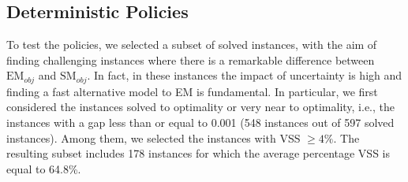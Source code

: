 \documentclass[authoryear,preprint,12pt]{elsarticle}
\begin{document}



\subsection{Deterministic Policies}\label{detpolicies}

To test the policies, we selected a subset of solved instances, with the aim of finding challenging instances where there is a remarkable difference between $\text{EM}_{obj}$ and $\text{SM}_{obj}$. In fact, in these instances the impact of uncertainty is high and finding a fast alternative model to EM is fundamental.  In particular, we first considered the instances solved to optimality or very near to optimality, i.e., the instances with a gap less than or equal to 0.001
(548 instances out of 597 solved instances). Among them, we selected the instances with VSS $\geq 4\%$. The resulting subset includes 178 instances for which the average percentage VSS is equal to 64.8\%.
\end{document}
